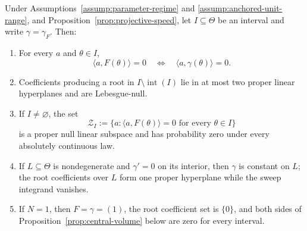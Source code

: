 \begin{lemma}
\label{lem:central-null-classes}
Under Assumptions~\ref{assump:parameter-regime} and
\ref{assump:anchored-unit-range}, and
Proposition~\ref{prop:projective-speed}, let $I\subseteq\Theta$ be an
interval and write $\gamma=\gamma_F$.  Then:
\begin{enumerate}
\item For every $a$ and $\theta\in I$,
\[
\langle a,F(\theta)\rangle=0
\quad\Longleftrightarrow\quad
\langle a,\gamma(\theta)\rangle=0.
\tag{A.2}
\]
\item Coefficients producing a root in
$I\setminus\operatorname{int}(I)$ lie in at most two proper linear
hyperplanes and are Lebesgue-null.
\item If $I\neq\varnothing$, the set
\[
\mathcal Z_I:=\{a:\langle a,F(\theta)\rangle=0
                  \text{ for every }\theta\in I\}
\]
is a proper null linear subspace and has probability zero under every
absolutely continuous law.
\item If $L\subseteq\Theta$ is nondegenerate and $\gamma'=0$ on its
interior, then $\gamma$ is constant on $L$; the root coefficients over $L$
form one proper hyperplane while the sweep integrand vanishes.
\item If $N=1$, then $F=\gamma=(1)$, the root coefficient set is $\{0\}$,
and both sides of Proposition~\ref{prop:central-volume} below are zero for
every interval.
\end{enumerate}
\end{lemma}

